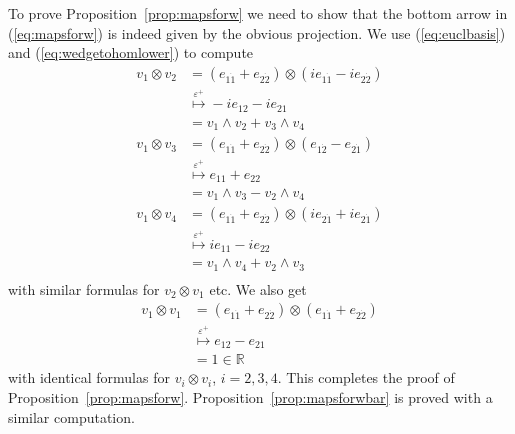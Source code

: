 \documentclass[twoside]{amsart}
\newcommand{\RR}{\ensuremath{\mathbb{R}}}
\renewcommand{\eqref}[1]{(\ref{eq:#1})}
\newcommand{\propref}[1]{Proposition~\ref{prop:#1}}
\renewcommand{\epsilon}{\varepsilon}
\newcommand{\enm}[1]{\ensuremath{#1}}
\newcommand{\eps}{\enm{\epsilon}}
\renewcommand{\epsilon}{\varepsilon}
\newcommand{\bothlowerabc}[3]{\enm{{#1}_{#2 #3}}}
\newcommand{\dotbothlowerabc}[3]{\bothlowerabc{#1}{#2}{\dot{#3}}}
\renewcommand{\ell}[2]{\bothlowerabc{e}{#1}{#2}}
\newcommand{\eldl}[2]{\dotbothlowerabc{e}{#1}{#2}}
\begin{document}
\proof To prove \propref{mapsforw} we need to show that the bottom arrow
in \eqref{mapsforw} is indeed given by
the obvious projection.
We use \eqref{euclbasis} and \eqref{wedgetohomlower} to compute
\begin{align*}
    v_{1}\otimes v_{2} &= ( \eldl{1}{1} +  \eldl{2}{2})
                \otimes (i\eldl{1}{1} - i\eldl{2}{2}) \\
                &\stackrel{\eps^{+}}{\mapsto}
                -i\ell{1}{2} - i\ell{2}{1} \\
                &= v_{1}\wedge v_{2} + v_{3}\wedge v_{4} \\
    v_{1}\otimes v_{3} &= ( \eldl{1}{1} +  \eldl{2}{2})
                \otimes (\eldl{1}{2} - \eldl{2}{1}) \\
                &\stackrel{\eps^{+}}{\mapsto}
                \ell{1}{1} + \ell{2}{2} \\
                &= v_{1}\wedge v_{3} - v_{2}\wedge v_{4} \\
    v_{1}\otimes v_{4} &= ( \eldl{1}{1} +  \eldl{2}{2})
                \otimes (i\eldl{2}{1} + i\eldl{2}{1}) \\
                &\stackrel{\eps^{+}}{\mapsto}
                i\ell{1}{1} - i\ell{2}{2} \\
                &= v_{1}\wedge v_{4} + v_{2}\wedge v_{3} \\
\end{align*}
with similar formulas for \( v_{2}\otimes v_{1} \) etc.  We also get
\begin{align*}
    v_{1}\otimes v_{1} &= ( \eldl{1}{1} +  \eldl{2}{2})
        \otimes (\eldl{1}{1} + \eldl{2}{2}) \\
        &\stackrel{\eps^{+}}{\mapsto} \ell{1}{2} - \ell{2}{1} \\
        &= 1 \in\RR
\end{align*}
with identical formulas for \( v_{i}\otimes v_{i} \), \( i=2, 3, 4.
\) This completes the proof of \propref{mapsforw}.
\propref{mapsforwbar} is proved with a similar computation.
\end{document}
